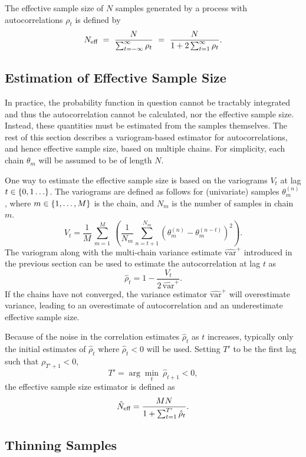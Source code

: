 The effective sample size of $N$ samples generated by a process with
autocorrelations $\rho_t$ is defined by
\[
N_{\mbox{\scriptsize eff}}
\ = \
\frac{N}{\sum_{t = -\infty}^{\infty} \rho_t}
\ = \
\frac{N}{1 + 2 \sum_{t = 1}^{\infty} \rho_t}.
\]

\subsection{Estimation of Effective Sample Size}

In practice, the probability function in question cannot be tractably
integrated and thus the autocorrelation cannot be calculated, nor the
effective sample size.  Instead, these quantities must be estimated
from the samples themselves.  The rest of this section describes a
variogram-based estimator for autocorrelations, and hence effective sample
size, based on multiple chains. For simplicity, each chain
$\theta_m$ will be assumed to be of length $N$.

One way to estimate the effective sample size is based on the
variograms $V_t$ at lag $t \in \setlist{0,1\ldots}$.  The variograms are
defined as follows for (univariate) samples $\theta_m^{(n)}$, where $m \in
\setlist{1,\ldots,M}$ is the chain, and $N_m$ is the number of samples
in chain $m$.
\[
V_t = 
\frac{1}{M}
\,
\sum_{m=1}^M 
\
\left(
\frac{1}{N_m}
\sum_{n=t+1}^{N_m}
\left(
\theta_m^{(n)} - \theta_m^{(n-t)}
\right)^2
\right).
\]
%
The variogram along with the multi-chain variance estimate
$\widehat{\mbox{var}}^{+}$ introduced in the previous section can be
used to estimate the autocorrelation at lag $t$ as
\[
\hat{\rho}_t
= 1 - \frac{\displaystyle V_t}{
            \displaystyle 2 \, \widehat{\mbox{var}}^{+}}.
\]
If the chains have not converged, the variance estimator
$\widehat{\mbox{var}}^{+}$ will overestimate variance, 
leading to an overestimate of autocorrelation and an underestimate
effective sample size.

Because of the noise in the correlation estimates $\hat{\rho}_t$ as $t$
increases, typically only the initial estimates of $\hat{\rho}_t$
where $\hat{\rho}_t < 0$ will be used.  Setting $T'$ to be the
first lag such that $\rho_{T' + 1} < 0$, 
\[
T' = \arg\min_t \ \hat{\rho}_{t+1} < 0,
\]
the effective sample size estimator is defined as
\[
\hat{N}_{\mbox{\scriptsize eff}}
= 
\frac{MN}
     {1 + \sum_{t=1}^{T'} \hat{\rho}_t}.
\]

\subsection{Thinning Samples}

